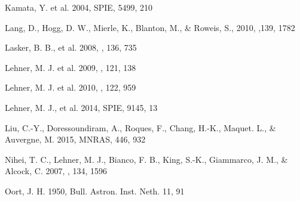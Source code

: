 \documentclass{pasj01}
\begin{document}
\begin{thebibliography}{}

 Kamata, Y. et al. 2004, SPIE, 5499, 210


 Lang, D., Hogg, D. W., Mierle, K., Blanton, M., \& Roweis, S., 2010, \aj,139, 1782

 Lasker, B. B., et al. 2008, \aj, 136, 735

 Lehner, M. J. et al. 2009, \pasp, 121, 138

 Lehner, M. J. et al. 2010, \pasp, 122, 959



 Lehner, M. J., et al. 2014, SPIE, 9145, 13


 Liu, C.-Y., Doressoundiram, A., Roques, F., Chang, H.-K., Maquet. L., \& Auvergne, M. 2015, MNRAS, 446, 932



 Nihei, T. C., Lehner, M. J., Bianco, F. B., King, S.-K., Giammarco, J. M., \& Alcock, C. 2007, \aj, 134, 1596

 Oort, J. H. 1950, Bull. Astron. Inst. Neth. 11, 91 





\end{thebibliography}
\end{document}
